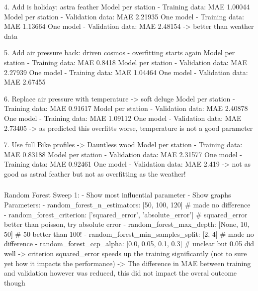 \documentclass{article}
\begin{document}
{{{{{{{{        4. Add is holiday: astra feather
                Model per station - Training data: MAE 1.00044
                Model per station - Validation data: MAE 2.21935
                One model - Training data: MAE 1.13664
                One model - Validation data: MAE 2.48154
                -> better than weather data

        5. Add air pressure back: driven cosmos - overfitting starts again
                Model per station - Training data: MAE 0.8418
                Model per station - Validation data: MAE 2.27939
                One model - Training data: MAE 1.04464
                One model - Validation data: MAE 2.67455


        6. Replace air pressure with temperature -> soft deluge
                Model per station - Training data: MAE 0.91617
                Model per station - Validation data: MAE 2.40878
                One model - Training data: MAE 1.09112
                One model - Validation data: MAE 2.73405
                -> as predicted this overfitts worse, temperature is not a good parameter

        7. Use full Bike profiles -> Dauntless wood
            Model per station - Training data: MAE 0.83188
            Model per station - Validation data: MAE 2.31577
            One model - Training data: MAE 0.92461
            One model - Validation data: MAE 2.419
                -> not as good as astral feather but not as overfitting as the weather!


        \subsubsection*{}

        Random Forest Sweep 1:
        - Show most influential parameter
        - Show graphs
        Parameters:
        - random_forest_n_estimators:  [50, 100, 120] # made no difference
        - random_forest_criterion: ['squared_error', 'absolute_error']  # squared_error better than poisson, try absolute error
        - random_forest_max_depth: [None, 10, 50]  # 50 better than 100!
        - random_forest_min_samples_split: [2, 4] # made no difference
        - random_forest_ccp_alpha: [0.0, 0.05, 0.1, 0.3]  # unclear but 0.05 did well
        -> criterion squared_error speeds up the training significantly (not to sure yet how it impacts the performance)
        -> The difference in MAE between training and validation however was reduced, this did not impact the overal outcome though

}}}}}}}}
\end{document}
